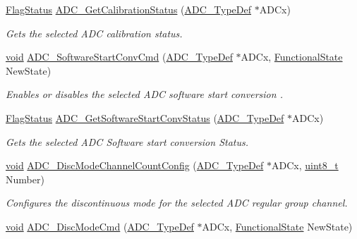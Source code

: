 \begin{DoxyCompactItemize}
\hyperlink{agilefox_2library_2inc_2stm32f10x__type_8h_a89136caac2e14c55151f527ac02daaff}{Flag\+Status} \hyperlink{group___a_d_c___exported___functions_ga7a728f699b487c7fa1694d7424967122}{A\+D\+C\+\_\+\+Get\+Calibration\+Status} (\hyperlink{struct_a_d_c___type_def}{A\+D\+C\+\_\+\+Type\+Def} $\ast$A\+D\+Cx)
\begin{DoxyCompactList}\small\item\em Gets the selected A\+DC calibration status. \end{DoxyCompactList}\item 
\hyperlink{usb__devapi_8h_afabf60e7f57651d6d595a02c75f07cd0}{void} \hyperlink{group___a_d_c___exported___functions_ga694130a8d1ad3c8877b7eddb29611b30}{A\+D\+C\+\_\+\+Software\+Start\+Conv\+Cmd} (\hyperlink{struct_a_d_c___type_def}{A\+D\+C\+\_\+\+Type\+Def} $\ast$A\+D\+Cx, \hyperlink{agilefox_2library_2inc_2stm32f10x__type_8h_ac9a7e9a35d2513ec15c3b537aaa4fba1}{Functional\+State} New\+State)
\begin{DoxyCompactList}\small\item\em Enables or disables the selected A\+DC software start conversion . \end{DoxyCompactList}\item 
\hyperlink{agilefox_2library_2inc_2stm32f10x__type_8h_a89136caac2e14c55151f527ac02daaff}{Flag\+Status} \hyperlink{group___a_d_c___exported___functions_gaf1119583782ecbcec380efcb7eb74883}{A\+D\+C\+\_\+\+Get\+Software\+Start\+Conv\+Status} (\hyperlink{struct_a_d_c___type_def}{A\+D\+C\+\_\+\+Type\+Def} $\ast$A\+D\+Cx)
\begin{DoxyCompactList}\small\item\em Gets the selected A\+DC Software start conversion Status. \end{DoxyCompactList}\item 
\hyperlink{usb__devapi_8h_afabf60e7f57651d6d595a02c75f07cd0}{void} \hyperlink{group___a_d_c___exported___functions_ga6eb241ba82d67d1371136c9132083937}{A\+D\+C\+\_\+\+Disc\+Mode\+Channel\+Count\+Config} (\hyperlink{struct_a_d_c___type_def}{A\+D\+C\+\_\+\+Type\+Def} $\ast$A\+D\+Cx, \hyperlink{_p_e___types_8h_aba7bc1797add20fe3efdf37ced1182c5}{uint8\+\_\+t} Number)
\begin{DoxyCompactList}\small\item\em Configures the discontinuous mode for the selected A\+DC regular group channel. \end{DoxyCompactList}\item 
\hyperlink{usb__devapi_8h_afabf60e7f57651d6d595a02c75f07cd0}{void} \hyperlink{group___a_d_c___exported___functions_ga1909649d10253ce88d986ffbb94a4be6}{A\+D\+C\+\_\+\+Disc\+Mode\+Cmd} (\hyperlink{struct_a_d_c___type_def}{A\+D\+C\+\_\+\+Type\+Def} $\ast$A\+D\+Cx, \hyperlink{agilefox_2library_2inc_2stm32f10x__type_8h_ac9a7e9a35d2513ec15c3b537aaa4fba1}{Functional\+State} New\+State)

\end{DoxyCompactItemize}

